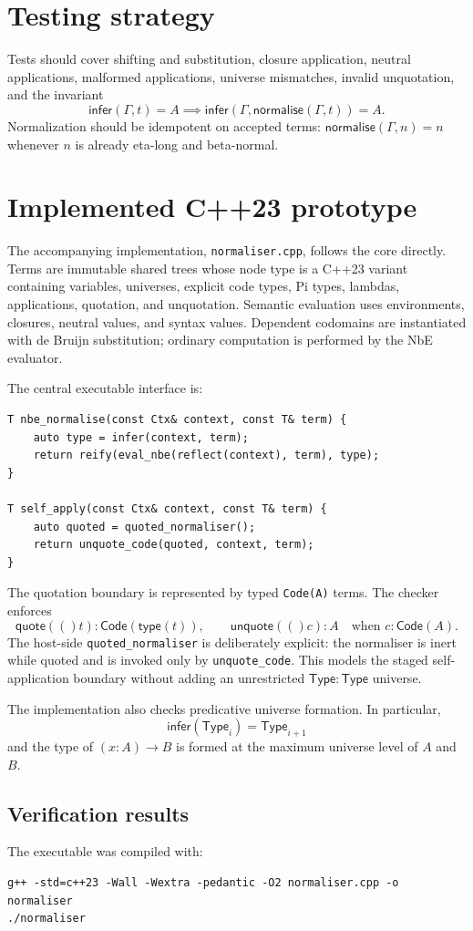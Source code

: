 \documentclass[11pt,a4paper]{article}
\newcommand{\Ty}{\mathsf{Type}}
\newcommand{\Code}{\mathsf{Code}}
\renewcommand{\quote}[1]{\mathsf{quote}(#1)}
\newcommand{\unquote}[1]{\mathsf{unquote}(#1)}
\begin{document}
\section{Testing strategy}
Tests should cover shifting and substitution, closure application, neutral applications, malformed applications, universe mismatches, invalid unquotation, and the invariant
\[
\mathsf{infer}(\Gamma,t)=A\implies \mathsf{infer}(\Gamma,\mathsf{normalise}(\Gamma,t))=A.
\]
Normalization should be idempotent on accepted terms: $\mathsf{normalise}(\Gamma,n)=n$ whenever $n$ is already eta-long and beta-normal.

\section{Implemented C++23 prototype}
The accompanying implementation, \texttt{normaliser.cpp}, follows the core directly. Terms are immutable shared trees whose node type is a C++23 variant containing variables, universes, explicit code types, Pi types, lambdas, applications, quotation, and unquotation. Semantic evaluation uses environments, closures, neutral values, and syntax values. Dependent codomains are instantiated with de Bruijn substitution; ordinary computation is performed by the NbE evaluator.

The central executable interface is:
\begin{lstlisting}
T nbe_normalise(const Ctx& context, const T& term) {
    auto type = infer(context, term);
    return reify(eval_nbe(reflect(context), term), type);
}

T self_apply(const Ctx& context, const T& term) {
    auto quoted = quoted_normaliser();
    return unquote_code(quoted, context, term);
}
\end{lstlisting}

The quotation boundary is represented by typed \texttt{Code(A)} terms. The checker enforces
\[
\quote(t):\Code(\mathsf{type}(t)),\qquad
\unquote(c):A\quad\text{when }c:\Code(A).
\]
The host-side \texttt{quoted\_normaliser} is deliberately explicit: the normaliser is inert while quoted and is invoked only by \texttt{unquote\_code}. This models the staged self-application boundary without adding an unrestricted $\Ty:\Ty$ universe.

The implementation also checks predicative universe formation. In particular,
\[
\mathsf{infer}(\Ty_i)=\Ty_{i+1}
\]
and the type of $(x:A)\to B$ is formed at the maximum universe level of $A$ and $B$.

\subsection{Verification results}
The executable was compiled with:
\begin{lstlisting}
g++ -std=c++23 -Wall -Wextra -pedantic -O2 normaliser.cpp -o normaliser
./normaliser
\end{lstlisting}
\end{document}
